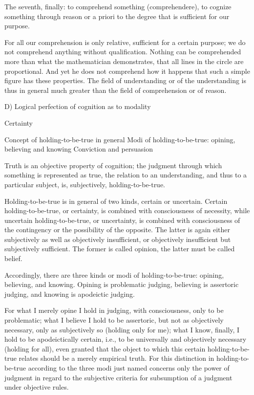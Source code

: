     The seventh, finally: to comprehend something (comprehendere),
    to cognize something through reason or a priori
    to the degree that is sufficient for our purpose.

    For all our comprehension is only relative,
    sufficient for a certain purpose;
    we do not comprehend anything without qualification.
    Nothing can be comprehended more than
    what the mathematician demonstrates,
    that all lines in the circle are proportional.
    And yet he does not comprehend how it happens
    that such a simple figure has these properties.
    The field of understanding or of the understanding is
    thus in general much greater than
    the field of comprehension or of reason.

    D) Logical perfection of cognition as to modality

    Certainty

        Concept of holding-to-be-true in general
        Modi of holding-to-be-true: opining, believing and knowing
        Conviction and persuasion

    Truth is an objective property of cognition;
    the judgment through which something is represented as true,
    the relation to an understanding, and thus to a particular subject, is,
    subjectively, holding-to-be-true.

    Holding-to-be-true is in general of two kinds, certain or uncertain.
    Certain holding-to-be-true, or certainty, is
    combined with consciousness of necessity,
    while uncertain holding-to-be-true, or uncertainty, is
    combined with consciousness of the contingency
    or the possibility of the opposite.
    The latter is again either subjectively
    as well as objectively insufficient,
    or objectively insufficient but subjectively sufficient.
    The former is called opinion, the latter must be called belief.

    Accordingly, there are three kinds or modi of holding-to-be-true:
    opining, believing, and knowing.
    Opining is problematic judging,
    believing is assertoric judging,
    and knowing is apodeictic judging.

    For what I merely opine I hold in judging,
    with consciousness, only to be problematic;
    what I believe I hold to be assertoric,
    but not as objectively necessary,
    only as subjectively so (holding only for me);
    what I know, finally, I hold to be apodeictically certain,
    i.e., to be universally and objectively necessary
    (holding for all),
    even granted that the object
    to which this certain holding-to-be-true relates
    should be a merely empirical truth.
    For this distinction in holding-to-be-true
    according to the three modi just named concerns only
    the power of judgment in regard to
    the subjective criteria for subsumption of
    a judgment under objective rules.


